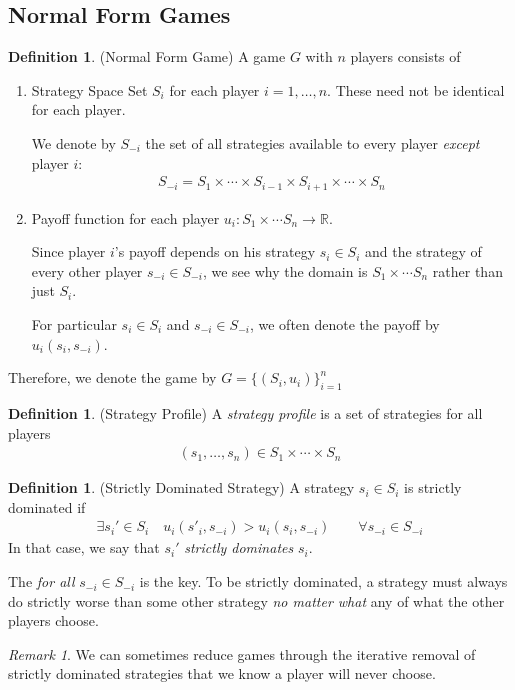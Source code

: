 \documentclass[12pt]{article}
\theoremstyle{plain}
\theoremstyle{definition}
\newtheorem{defn}[thm]{Definition}
\theoremstyle{remark}
\newtheorem*{rmk}{Remark}
\newcommand{\ra}{\rightarrow}
\newcommand{\R}{\mathbb{R}}
\begin{document}
\subsection{Normal Form Games}

\begin{defn}(Normal Form Game)
A game $G$ with $n$ players consists of
\begin{enumerate}
  \item Strategy Space Set $S_i$ for each player $i=1,\ldots,n$.
    These need not be identical for each player.

    We denote by $S_{-i}$ the set of all strategies available
    to every player \emph{except} player $i$:
    \begin{align*}
      S_{-i}
      =S_1\times\cdots\times S_{i-1} \times S_{i+1} \times\cdots \times S_n
    \end{align*}
  \item Payoff function for each player $u_i:S_1\times\cdots S_n\ra \R$.

    Since player $i$'s payoff depends on his strategy $s_i\in S_i$ and
    the strategy of every other player $s_{-i}\in S_{-i}$, we see why
    the domain is $S_1\times\cdots S_n$ rather than just $S_i$.

    For particular $s_i\in S_i$ and $s_{-i}\in S_{-i}$, we often denote
    the payoff by $u_i(s_i,s_{-i})$.
\end{enumerate}
Therefore, we denote the game by $G=\{(S_i,u_i)\}^n_{i=1}$
\end{defn}

\begin{defn}(Strategy Profile)
A \emph{strategy profile} is a set of strategies for all players
\begin{align*}
  (s_1,\ldots,s_n) \in S_1 \times \cdots \times S_n
\end{align*}
\end{defn}


\begin{defn}(Strictly Dominated Strategy)
A strategy $s_i\in S_i$ is strictly dominated if
\begin{align*}
  \exists s_i' \in S_i
  \quad
  u_i(s'_i,s_{-i})
  >
  u_i(s_i,s_{-i})
  \qquad \forall s_{-i}\in S_{-i}
\end{align*}
In that case, we say that $s_i'$ \emph{strictly dominates} $s_i$.

The \emph{for all} $s_{-i}\in S_{-i}$ is the key. To be strictly
dominated, a strategy must always do strictly worse than some other
strategy \emph{no matter what} any of what the other players choose.
\end{defn}
\begin{rmk}
We can sometimes reduce games through the iterative removal of strictly
dominated strategies that we know a player will never choose.
\end{rmk}
\end{document}
